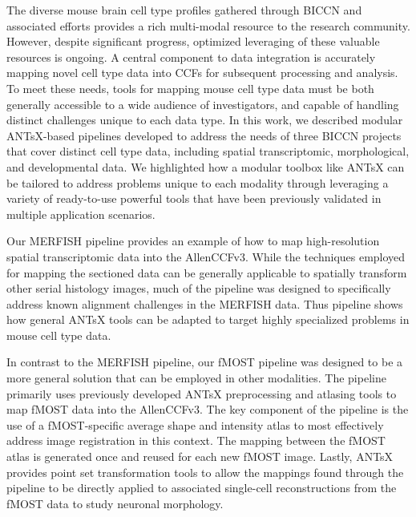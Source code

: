 \documentclass[
  12pt,
]{article}
\begin{document}
The diverse mouse brain cell type profiles gathered through BICCN and
associated efforts provides a rich multi-modal resource to the research
community. However, despite significant progress, optimized leveraging
of these valuable resources is ongoing. A central component to data
integration is accurately mapping novel cell type data into CCFs for
subsequent processing and analysis. To meet these needs, tools for
mapping mouse cell type data must be both generally accessible to a wide
audience of investigators, and capable of handling distinct challenges
unique to each data type. In this work, we described modular ANTsX-based
pipelines developed to address the needs of three BICCN projects that
cover distinct cell type data, including spatial transcriptomic,
morphological, and developmental data. We highlighted how a modular
toolbox like ANTsX can be tailored to address problems unique to each
modality through leveraging a variety of ready-to-use powerful tools
that have been previously validated in multiple application scenarios.

Our MERFISH pipeline provides an example of how to map high-resolution
spatial transcriptomic data into the AllenCCFv3. While the techniques
employed for mapping the sectioned data can be generally applicable to
spatially transform other serial histology images, much of the pipeline
was designed to specifically address known alignment challenges in the
MERFISH data. Thus pipeline shows how general ANTsX tools can be adapted
to target highly specialized problems in mouse cell type data.

In contrast to the MERFISH pipeline, our fMOST pipeline was designed to
be a more general solution that can be employed in other modalities. The
pipeline primarily uses previously developed ANTsX preprocessing and
atlasing tools to map fMOST data into the AllenCCFv3. The key component
of the pipeline is the use of a fMOST-specific average shape and
intensity atlas to most effectively address image registration in this
context. The mapping between the fMOST atlas is generated once and
reused for each new fMOST image. Lastly, ANTsX provides point set
transformation tools to allow the mappings found through the pipeline to
be directly applied to associated single-cell reconstructions from the
fMOST data to study neuronal morphology.
\end{document}
